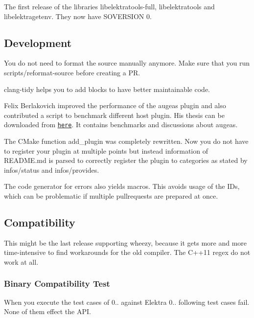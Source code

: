 The first release of the libraries libelektratools-\/full, libelektratools and libelektragetenv. They now have S\+O\+V\+E\+R\+S\+I\+ON 0.

\subsection*{Development}

You do not need to format the source manually anymore. Make sure that you run scripts/reformat-\/source before creating a PR.

{\ttfamily clang-\/tidy} helps you to add blocks to have better maintainable code.

Felix Berlakovich improved the performance of the augeas plugin and also contributed a script to benchmark different host plugin. His thesis can be downloaded from \href{https://www.libelektra.org/ftp/elektra/berlakovich2016universal.pdf}{\tt here}. It contains benchmarks and discussions about augeas.

The C\+Make function {\ttfamily add\+\_\+plugin} was completely rewritten. Now you do not have to register your plugin at multiple points but instead information of R\+E\+A\+D\+M\+E.\+md is parsed to correctly register the plugin to categories as stated by {\ttfamily infos/status} and {\ttfamily infos/provides}.

The code generator for errors also yields macros. This avoids usage of the I\+Ds, which can be problematic if multiple pullrequests are prepared at once.

\subsection*{Compatibility}

This might be the last release supporting wheezy, because it gets more and more time-\/intensive to find workarounds for the old compiler. The C++11 regex do not work at all.

\subsubsection*{Binary Compatibility Test}

When you execute the test cases of 0.. against Elektra 0.. following test cases fail. None of them effect the A\+PI.


